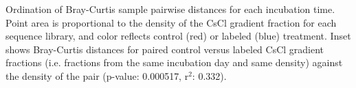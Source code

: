 Ordination of Bray-Curtis sample pairwise distances for each incubation time. Point area is proportional to the density of the CsCl gradient fraction for each sequence library, and color reflects control (red) or labeled (blue) treatment. Inset shows Bray-Curtis distances for paired control versus labeled CsCl gradient fractions (i.e. fractions from the same incubation day and same density) against the density of the pair (p-value: 0.000517, r$^{2}$: 0.332). 